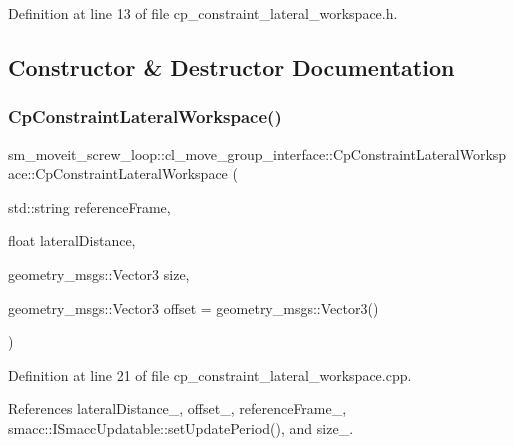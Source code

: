 Definition at line 13 of file cp\+\_\+constraint\+\_\+lateral\+\_\+workspace.\+h.



\subsection{Constructor \& Destructor Documentation}
\mbox{\label{classsm__moveit__screw__loop_1_1cl__move__group__interface_1_1CpConstraintLateralWorkspace_a37065320fffc1d241bb90965671919c2}} 
\subsubsection{\texorpdfstring{Cp\+Constraint\+Lateral\+Workspace()}{CpConstraintLateralWorkspace()}}
{\footnotesize\ttfamily sm\+\_\+moveit\+\_\+screw\+\_\+loop\+::cl\+\_\+move\+\_\+group\+\_\+interface\+::\+Cp\+Constraint\+Lateral\+Workspace\+::\+Cp\+Constraint\+Lateral\+Workspace (\begin{DoxyParamCaption}\item[{std\+::string}]{reference\+Frame,  }\item[{float}]{lateral\+Distance,  }\item[{geometry\+\_\+msgs\+::\+Vector3}]{size,  }\item[{geometry\+\_\+msgs\+::\+Vector3}]{offset = {\ttfamily geometry\+\_\+msgs\+:\+:Vector3()} }\end{DoxyParamCaption})}



Definition at line 21 of file cp\+\_\+constraint\+\_\+lateral\+\_\+workspace.\+cpp.



References lateral\+Distance\+\_\+, offset\+\_\+, reference\+Frame\+\_\+, smacc\+::\+I\+Smacc\+Updatable\+::set\+Update\+Period(), and size\+\_\+.


